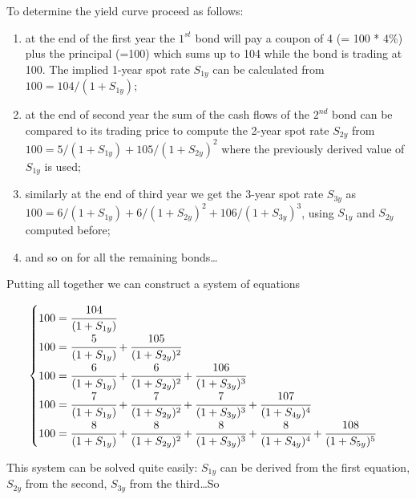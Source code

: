 To determine the yield curve proceed as follows:
\begin{enumerate}
\item at the end of the first year the $1^{st}$ bond will pay a coupon of 4 (= 100 * 4\%) plus the principal (=100) which sums up to 104 while the bond is trading at 100. The implied 1-year spot rate $S_{1y}$ can be calculated from $\mbox{100} = \mbox{104} / (1 + S_{1y})$;

\item at the end of second year the sum of the cash flows of the $2^{nd}$ bond can be compared to its trading price to compute the 2-year spot rate $S_{2y}$ from $\mbox{100} = \mbox{5} / (1 + S_{1y}) + \mbox{105} / (1 + S_{2y})^{2}$ where the previously derived value of $S_{1y}$ is used;

\item similarly at the end of third year we get the 3-year spot rate $S_{3y}$ as $\mbox{100} = \mbox{6} / (1 + S_{1y}) + \mbox{6} / (1 + S_{2y})^{2} + \mbox{106} / (1 + S_{3y})^{3}$, using $S_{1y}$ and $S_{2y}$ computed before;

\item and so on for all the remaining bonds\ldots
\end{enumerate}

Putting all together we can construct a system of equations

\begin{equation}
\begin{cases}
100 = \cfrac{104}{(1 + S_{1y})} \\
100 = \cfrac{5}{(1 + S_{1y})} + \cfrac{105}{(1 + S_{2y})^{2}} \\
100 = \cfrac{6} {(1 + S_{1y})} + \cfrac{6}{(1 + S_{2y})^{2}} + \cfrac{106} {(1 + S_{3y})^{3}} \\
100 = \cfrac{7} {(1 + S_{1y})} + \cfrac{7} {(1 + S_{2y})^{2}} + \cfrac{7} {(1 + S_{3y})^{3}} + \cfrac{107} {(1 + S_{4y})^{4}} \\
100 = \cfrac{8} {(1 + S_{1y})} + \cfrac{8} {(1 + S_{2y})^{2}}+ \cfrac{8} {(1 + S_{3y})^{3}} + \cfrac{8} {(1 + S_{4y})^{4}} + \cfrac{108} {(1 + S_{5y})^{5}}
\end{cases}
\label{eq:fifth_year_rate}
\end{equation}

This system can be solved quite easily: $S_{1y}$ can be derived from the first equation, $S_{2y}$ from the second, $S_{3y}$ from the third\ldots So

